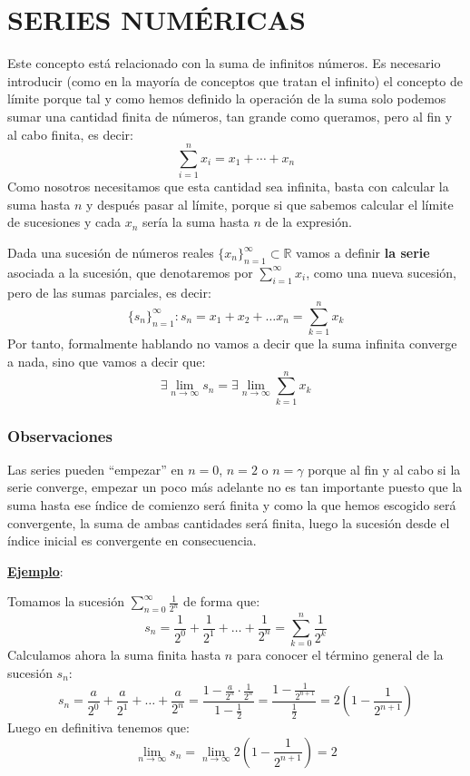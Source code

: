 \documentclass[10pt,a4paper,openright]{book}
\begin{document}
\section*{SERIES NUMÉRICAS}
Este concepto está relacionado con la suma de infinitos números. Es necesario introducir (como en la mayoría de conceptos que tratan el infinito) el concepto de límite porque tal y como hemos definido la operación de la suma solo podemos sumar una cantidad finita de números, tan grande como queramos, pero al fin y al cabo finita, es decir:
$$\sum_{i=1}^{n} x_i = x_1 + \cdots + x_n$$
Como nosotros necesitamos que esta cantidad sea infinita, basta con calcular la suma hasta $n$ y después pasar al límite, porque si que sabemos calcular el límite de sucesiones y cada $x_n$ sería la suma hasta $n$ de la expresión.

Dada una sucesión de números reales $\{x_n\}_{n=1}^\infty\subset \mathbb R$ vamos a definir \textbf{la serie} asociada a la sucesión, que denotaremos por $\displaystyle \sum_{i = 1 }^{\infty} x_i$, como una nueva sucesión, pero de las sumas parciales, es decir:
$$\{s_n\}_{n=1}^\infty: s_n = x_1 + x_2 + \ldots x_n = \sum_{k=1}^{n} x_k$$
Por tanto, formalmente hablando no vamos a decir que la suma infinita converge a nada, sino que vamos a decir que:
$$\exists \lim_{n \to \infty} s_n = \exists\lim_{n \to \infty} \sum_{k=1}^{n} x_k$$

\subsubsection*{Observaciones}
Las series pueden ``empezar'' en $n=0$, $n=2$ o $n=\gamma$ porque al fin y al cabo si la serie converge, empezar un poco más adelante no es tan importante puesto que la suma hasta ese índice de comienzo será finita y como la que hemos escogido será convergente, la suma de ambas cantidades será finita, luego la sucesión desde el índice inicial es convergente en consecuencia.

\underline{\textbf{Ejemplo}}:

Tomamos la sucesión $ \displaystyle \sum_{n=0}^{\infty} \frac{1}{2^n}$ de forma que:
$$s_n =\frac{1}{2^0} + \frac{1}{2^1} + \ldots + \frac{1}{2^n} = \sum_{k=0}^{n} \frac{1}{2^k}$$
Calculamos ahora la suma finita hasta $n$ para conocer el término general de la sucesión $s_n$:
$$s_n = \frac{a}{2^0} + \frac{a}{2^1} + \ldots + \frac{a}{2^n} = \frac{1 - \frac{a}{2^n} \cdot \frac{1}{2^n}}{1 - \frac{1}{2}} = \frac{1 - \frac{1}{2^{n+1}}}{\frac{1}{2}} = 2\left(1 - \frac{1}{2^{n+1}}\right)$$
Luego en definitiva tenemos que:
$$\lim_{n \to \infty} s_n = \lim_{n \to \infty}  2\left(1 - \frac{1}{2^{n+1}}\right) = 2$$
\end{document}
